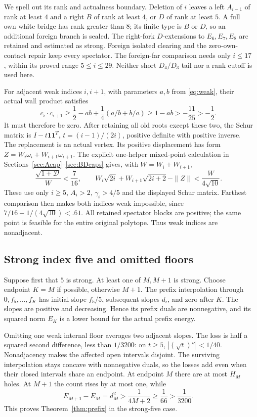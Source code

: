 \documentclass[11pt]{article}
\theoremstyle{remark}
\begin{document}
We spell out its rank and actualness boundary. Deletion of \(i\)
leaves a left \(A_{i-1}\) of rank at least \(4\) and a right
\(B\) of rank at least \(4\), or \(D\) of rank at least \(5\).
A full own white bridge has rank greater than \(8\); its finite
type is \(B\) or \(D\), so an additional foreign branch is sealed.
The right-fork \(D\)-extensions to \(E_6,E_7,E_8\) are retained
and estimated as strong. Foreign isolated clearing and the
zero-own-contact repair keep every spectator. The foreign-far
comparison needs only \(i\le17\), within its proved range
\(5\le i\le29\). Neither short \(D_4/D_3\) tail nor a rank cutoff
is used here.

For adjacent weak indices \(i,i+1\), with parameters \(a,b\)
from \eqref{eq:weak}, their actual wall product satisfies
\[
 c_i\cdot c_{i+1}
 \ge\frac12-ab+\frac14(a/b+b/a)
 \ge1-ab>-\frac{11}{25}>-\frac12 .
\]
It must therefore be zero. After retaining all old roots except
these two, the Schur matrix is \(I-t\mathbf1\mathbf1^T\),
\(t=(i-1)/(2i)\), positive definite with positive inverse.
The replacement is an actual vertex. Its positive displacement
has form \(Z=W_i\omega_i+W_{i+1}\omega_{i+1}\).
The explicit one-helper mixed-point calculation in
Sections~\ref{sec:Acap}--\ref{sec:BDcaps} gives, with \(W=W_i+W_{i+1}\),
\[
 \frac{\sqrt{1+\mathcal D}}W<\frac7{16},\qquad
 W_i\sqrt{2i}+W_{i+1}\sqrt{2i+2}-\|Z\|
             <\frac{W}{4\sqrt{10}}.
\]
These use only \(i\ge5\), \(A_i>2\), \(\gamma_i>4/5\) and the
displayed Schur matrix. Farthest comparison then makes both
indices weak impossible, since \(7/16+1/(4\sqrt{10})<.61\).
All retained spectator blocks are positive; the same point is
feasible for the entire original polytope. Thus weak indices
are nonadjacent.

\subsection{Strong index five and omitted floors}

Suppose first that \(5\) is strong. At least one of \(M,M+1\)
is strong. Choose endpoint \(K=M\) if possible, otherwise \(M+1\).
The prefix interpolation through \(0,f_5,\ldots,f_K\) has initial
slope \(f_5/5\), subsequent slopes \(d_i\), and zero after \(K\).
The slopes are positive and decreasing. Hence its prefix duals
are nonnegative, and its squared norm \(E_K\) is a lower bound
for the actual prefix energy.

Omitting one weak internal floor averages two adjacent slopes.
The loss is half a squared second difference, less than \(1/3200\):
on \(t\ge5\), \(|(\sqrt t)''|<1/40\). Nonadjacency makes the
affected open intervals disjoint. The surviving interpolation
stays concave with nonnegative duals, so the losses add even when
their closed intervals share an endpoint. At endpoint \(M\) there
are at most \(H_M\) holes. At \(M+1\) the count rises by at most one,
while
\[
 E_{M+1}-E_M=d_M^2>\frac1{4M+2}\ge\frac1{66}>\frac1{3200}.
\]
This proves Theorem~\ref{thm:prefix} in the strong-five case.
\end{document}

